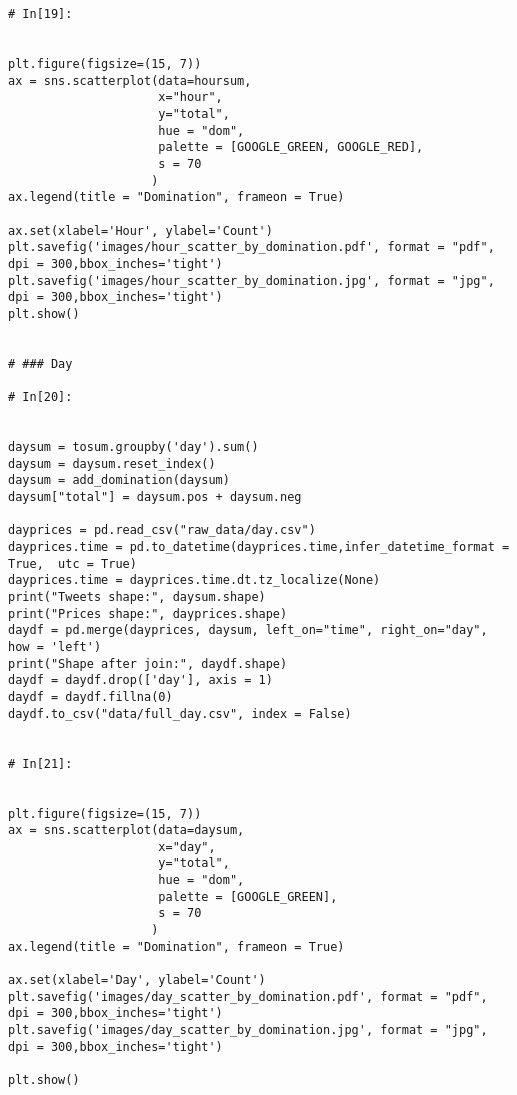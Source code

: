 \documentclass[12pt,a4paper]{article}
\begin{document}
\begin{lstlisting}[breaklines]
# In[19]:


plt.figure(figsize=(15, 7))
ax = sns.scatterplot(data=hoursum,
                     x="hour",
                     y="total",
                     hue = "dom",
                     palette = [GOOGLE_GREEN, GOOGLE_RED],
                     s = 70
                    )
ax.legend(title = "Domination", frameon = True)

ax.set(xlabel='Hour', ylabel='Count')
plt.savefig('images/hour_scatter_by_domination.pdf', format = "pdf", dpi = 300,bbox_inches='tight')
plt.savefig('images/hour_scatter_by_domination.jpg', format = "jpg", dpi = 300,bbox_inches='tight')
plt.show()


# ### Day 

# In[20]:


daysum = tosum.groupby('day').sum()
daysum = daysum.reset_index()
daysum = add_domination(daysum)
daysum["total"] = daysum.pos + daysum.neg

dayprices = pd.read_csv("raw_data/day.csv")
dayprices.time = pd.to_datetime(dayprices.time,infer_datetime_format = True,  utc = True)
dayprices.time = dayprices.time.dt.tz_localize(None)
print("Tweets shape:", daysum.shape)
print("Prices shape:", dayprices.shape)
daydf = pd.merge(dayprices, daysum, left_on="time", right_on="day", how = 'left')
print("Shape after join:", daydf.shape)
daydf = daydf.drop(['day'], axis = 1)
daydf = daydf.fillna(0)
daydf.to_csv("data/full_day.csv", index = False)


# In[21]:


plt.figure(figsize=(15, 7))
ax = sns.scatterplot(data=daysum,
                     x="day",
                     y="total",
                     hue = "dom",
                     palette = [GOOGLE_GREEN],
                     s = 70
                    )
ax.legend(title = "Domination", frameon = True)

ax.set(xlabel='Day', ylabel='Count')
plt.savefig('images/day_scatter_by_domination.pdf', format = "pdf", dpi = 300,bbox_inches='tight')
plt.savefig('images/day_scatter_by_domination.jpg', format = "jpg", dpi = 300,bbox_inches='tight')

plt.show()


\end{lstlisting}
\end{document}
